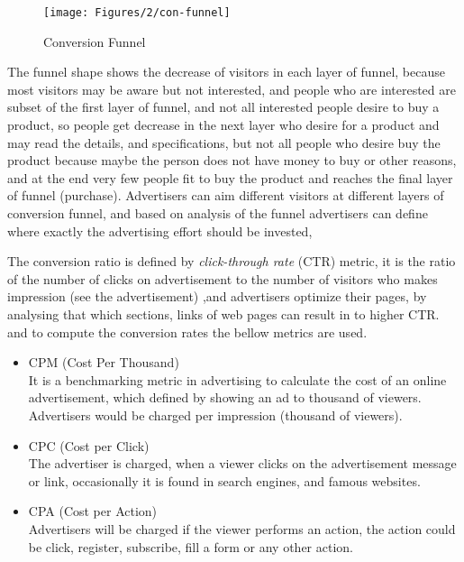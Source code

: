 \begin{figure}[H]
\centering
\texttt{[image: Figures/2/con-funnel]}
\caption{Conversion Funnel}
\label{fig:conversion_funnel}
\end{figure}

The funnel shape shows the decrease of visitors in each layer of funnel, because most visitors may be aware but not interested, and people who are interested are subset of the first layer of funnel, and not all interested people desire to buy a product, so people get decrease in the next layer who desire for a product and may read the details, and specifications, but not all people who desire buy the product because maybe the person does not have money to buy or other reasons, and at the end very few people fit to buy the product and reaches the final layer of funnel (purchase). 
Advertisers can aim different visitors at different layers of conversion funnel, and based on analysis of the funnel advertisers can define where exactly the advertising effort should be invested, \cite{ad_effor_funnel}


The conversion ratio is defined by \emph{click-through rate} (CTR) metric, it is the ratio of the number of clicks on advertisement to the number of visitors who makes impression (see the advertisement) \cite{convfunnel},and advertisers optimize their pages, by analysing that which sections, links of web pages can result in to higher CTR. and to compute the conversion rates the bellow metrics are used.


\begin{itemize}
\item CPM (Cost Per Thousand) \\
It is a benchmarking metric in advertising to calculate the cost of an online advertisement, which defined by showing an ad to thousand of viewers. Advertisers would be charged per impression (thousand of viewers). 

\item CPC (Cost per Click) \\
The advertiser is charged, when a viewer clicks on the advertisement message or link, occasionally it is found in search engines, and famous websites. 

\item CPA (Cost per Action)\\
Advertisers will be charged if the viewer performs an action, the action could be click, register, subscribe, fill a form or any other action.

\end{itemize}





